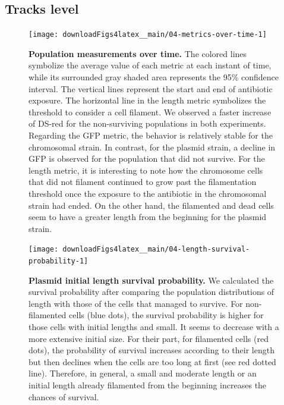 \documentclass[a4paper, nobind]{templates/ociamthesis}
\begin{document}
\hypertarget{tracks-level}{%
\subsection{Tracks level}\label{tracks-level}}





\begin{figure}[H]
\texttt{[image: downloadFigs4latex\_\_main/04-metrics-over-time-1]} \caption[Population measurements over time.]{\textbf{Population measurements over time.} The colored lines symbolize the average value of each metric at each instant of time, while its surrounded gray shaded area represents the 95\% confidence interval. The vertical lines represent the start and end of antibiotic exposure. The horizontal line in the length metric symbolizes the threshold to consider a cell filament. We observed a faster increase of DS-red for the non-surviving populations in both experiments. Regarding the GFP metric, the behavior is relatively stable for the chromosomal strain. In contrast, for the plasmid strain, a decline in GFP is observed for the population that did not survive. For the length metric, it is interesting to note how the chromosome cells that did not filament continued to grow past the filamentation threshold once the exposure to the antibiotic in the chromosomal strain had ended. On the other hand, the filamented and dead cells seem to have a greater length from the beginning for the plasmid strain.}\label{fig:04-metrics-over-time-1}
\end{figure}





\begin{figure}[H]
\texttt{[image: downloadFigs4latex\_\_main/04-length-survival-probability-1]} \caption[Plasmid initial length survival probability.]{\textbf{Plasmid initial length survival probability.} We calculated the survival probability after comparing the population distributions of length with those of the cells that managed to survive. For non-filamented cells (blue dots), the survival probability is higher for those cells with initial lengths and small. It seems to decrease with a more extensive initial size. For their part, for filamented cells (red dots), the probability of survival increases according to their length but then declines when the cells are too long at first (see red dotted line). Therefore, in general, a small and moderate length or an initial length already filamented from the beginning increases the chances of survival.}\label{fig:04-length-survival-probability-1}
\end{figure}
\end{document}
